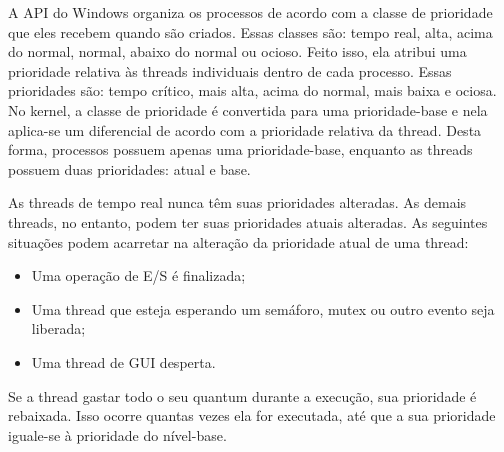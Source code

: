 A API do Windows organiza os processos de acordo com a classe de prioridade que eles recebem quando são criados. Essas classes são: tempo real, alta, acima do normal, normal, abaixo do normal ou ocioso. Feito isso, ela atribui uma prioridade relativa às threads individuais dentro de cada processo. Essas prioridades são: tempo crítico, mais alta, acima do normal, mais baixa e ociosa. No kernel, a classe de prioridade é convertida para uma prioridade-base e nela aplica-se um diferencial de acordo com a prioridade relativa da thread. Desta forma, processos possuem apenas uma prioridade-base, enquanto as threads possuem duas prioridades: atual e base. 

As threads de tempo real nunca têm suas prioridades alteradas. As demais threads, no entanto, podem ter suas prioridades atuais alteradas. As seguintes situações podem acarretar na alteração da prioridade atual de uma thread:
\begin{itemize}
	\item Uma operação de E/S é finalizada;
	\item Uma thread que esteja esperando um semáforo, mutex ou outro evento seja liberada;
	\item Uma thread de GUI desperta.
\end{itemize}

Se a thread gastar todo o seu quantum durante a execução, sua prioridade é rebaixada. Isso ocorre quantas vezes ela for executada, até que a sua prioridade iguale-se à prioridade do nível-base.
